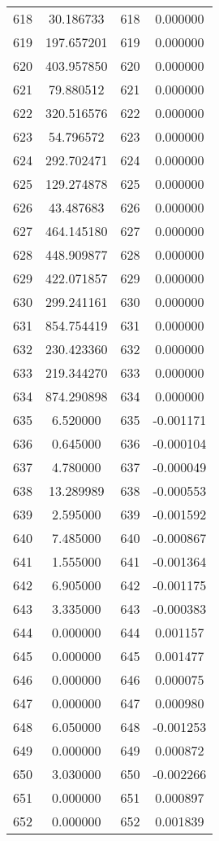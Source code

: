 \documentclass[12pt]{article}
\begin{document}
\begin{longtable}{@{}cccc@{}}
618 & 30.186733 & 618 & 0.000000 \\
619 & 197.657201 & 619 & 0.000000 \\
620 & 403.957850 & 620 & 0.000000 \\
621 & 79.880512 & 621 & 0.000000 \\
622 & 320.516576 & 622 & 0.000000 \\
623 & 54.796572 & 623 & 0.000000 \\
624 & 292.702471 & 624 & 0.000000 \\
625 & 129.274878 & 625 & 0.000000 \\
626 & 43.487683 & 626 & 0.000000 \\
627 & 464.145180 & 627 & 0.000000 \\
628 & 448.909877 & 628 & 0.000000 \\
629 & 422.071857 & 629 & 0.000000 \\
630 & 299.241161 & 630 & 0.000000 \\
631 & 854.754419 & 631 & 0.000000 \\
632 & 230.423360 & 632 & 0.000000 \\
633 & 219.344270 & 633 & 0.000000 \\
634 & 874.290898 & 634 & 0.000000 \\
635 & 6.520000 & 635 & -0.001171 \\
636 & 0.645000 & 636 & -0.000104 \\
637 & 4.780000 & 637 & -0.000049 \\
638 & 13.289989 & 638 & -0.000553 \\
639 & 2.595000 & 639 & -0.001592 \\
640 & 7.485000 & 640 & -0.000867 \\
641 & 1.555000 & 641 & -0.001364 \\
642 & 6.905000 & 642 & -0.001175 \\
643 & 3.335000 & 643 & -0.000383 \\
644 & 0.000000 & 644 & 0.001157 \\
645 & 0.000000 & 645 & 0.001477 \\
646 & 0.000000 & 646 & 0.000075 \\
647 & 0.000000 & 647 & 0.000980 \\
648 & 6.050000 & 648 & -0.001253 \\
649 & 0.000000 & 649 & 0.000872 \\
650 & 3.030000 & 650 & -0.002266 \\
651 & 0.000000 & 651 & 0.000897 \\
652 & 0.000000 & 652 & 0.001839 \\

\end{longtable}
\end{document}
